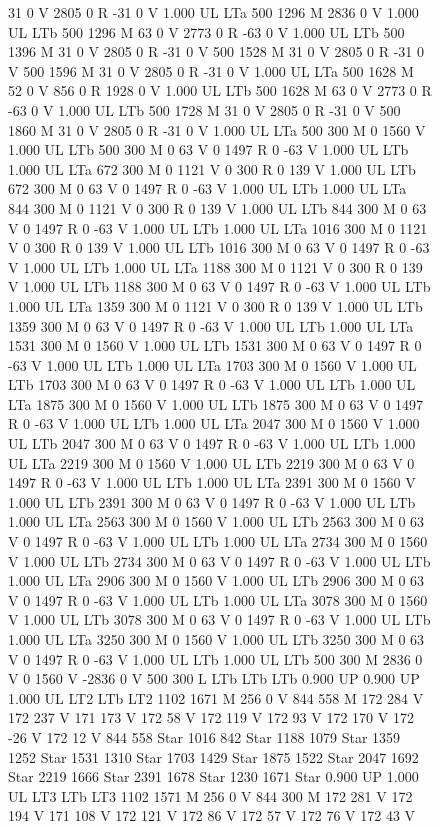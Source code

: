 \documentclass{LMCS}
\begin{document}
\begin{figure}[!tbp]
\begin{minipage}[b]{.47\linewidth}
{{{31 0 V
2805 0 R
-31 0 V
1.000 UL
LTa
500 1296 M
2836 0 V
1.000 UL
LTb
500 1296 M
63 0 V
2773 0 R
-63 0 V
1.000 UL
LTb
500 1396 M
31 0 V
2805 0 R
-31 0 V
500 1528 M
31 0 V
2805 0 R
-31 0 V
500 1596 M
31 0 V
2805 0 R
-31 0 V
1.000 UL
LTa
500 1628 M
52 0 V
856 0 R
1928 0 V
1.000 UL
LTb
500 1628 M
63 0 V
2773 0 R
-63 0 V
1.000 UL
LTb
500 1728 M
31 0 V
2805 0 R
-31 0 V
500 1860 M
31 0 V
2805 0 R
-31 0 V
1.000 UL
LTa
500 300 M
0 1560 V
1.000 UL
LTb
500 300 M
0 63 V
0 1497 R
0 -63 V
1.000 UL
LTb
1.000 UL
LTa
672 300 M
0 1121 V
0 300 R
0 139 V
1.000 UL
LTb
672 300 M
0 63 V
0 1497 R
0 -63 V
1.000 UL
LTb
1.000 UL
LTa
844 300 M
0 1121 V
0 300 R
0 139 V
1.000 UL
LTb
844 300 M
0 63 V
0 1497 R
0 -63 V
1.000 UL
LTb
1.000 UL
LTa
1016 300 M
0 1121 V
0 300 R
0 139 V
1.000 UL
LTb
1016 300 M
0 63 V
0 1497 R
0 -63 V
1.000 UL
LTb
1.000 UL
LTa
1188 300 M
0 1121 V
0 300 R
0 139 V
1.000 UL
LTb
1188 300 M
0 63 V
0 1497 R
0 -63 V
1.000 UL
LTb
1.000 UL
LTa
1359 300 M
0 1121 V
0 300 R
0 139 V
1.000 UL
LTb
1359 300 M
0 63 V
0 1497 R
0 -63 V
1.000 UL
LTb
1.000 UL
LTa
1531 300 M
0 1560 V
1.000 UL
LTb
1531 300 M
0 63 V
0 1497 R
0 -63 V
1.000 UL
LTb
1.000 UL
LTa
1703 300 M
0 1560 V
1.000 UL
LTb
1703 300 M
0 63 V
0 1497 R
0 -63 V
1.000 UL
LTb
1.000 UL
LTa
1875 300 M
0 1560 V
1.000 UL
LTb
1875 300 M
0 63 V
0 1497 R
0 -63 V
1.000 UL
LTb
1.000 UL
LTa
2047 300 M
0 1560 V
1.000 UL
LTb
2047 300 M
0 63 V
0 1497 R
0 -63 V
1.000 UL
LTb
1.000 UL
LTa
2219 300 M
0 1560 V
1.000 UL
LTb
2219 300 M
0 63 V
0 1497 R
0 -63 V
1.000 UL
LTb
1.000 UL
LTa
2391 300 M
0 1560 V
1.000 UL
LTb
2391 300 M
0 63 V
0 1497 R
0 -63 V
1.000 UL
LTb
1.000 UL
LTa
2563 300 M
0 1560 V
1.000 UL
LTb
2563 300 M
0 63 V
0 1497 R
0 -63 V
1.000 UL
LTb
1.000 UL
LTa
2734 300 M
0 1560 V
1.000 UL
LTb
2734 300 M
0 63 V
0 1497 R
0 -63 V
1.000 UL
LTb
1.000 UL
LTa
2906 300 M
0 1560 V
1.000 UL
LTb
2906 300 M
0 63 V
0 1497 R
0 -63 V
1.000 UL
LTb
1.000 UL
LTa
3078 300 M
0 1560 V
1.000 UL
LTb
3078 300 M
0 63 V
0 1497 R
0 -63 V
1.000 UL
LTb
1.000 UL
LTa
3250 300 M
0 1560 V
1.000 UL
LTb
3250 300 M
0 63 V
0 1497 R
0 -63 V
1.000 UL
LTb
1.000 UL
LTb
500 300 M
2836 0 V
0 1560 V
-2836 0 V
500 300 L
LTb
LTb
LTb
0.900 UP
0.900 UP
1.000 UL
LT2
LTb
LT2
1102 1671 M
256 0 V
844 558 M
172 284 V
172 237 V
171 173 V
172 58 V
172 119 V
172 93 V
172 170 V
172 -26 V
172 12 V
844 558 Star
1016 842 Star
1188 1079 Star
1359 1252 Star
1531 1310 Star
1703 1429 Star
1875 1522 Star
2047 1692 Star
2219 1666 Star
2391 1678 Star
1230 1671 Star
0.900 UP
1.000 UL
LT3
LTb
LT3
1102 1571 M
256 0 V
844 300 M
172 281 V
172 194 V
171 108 V
172 121 V
172 86 V
172 57 V
172 76 V
172 43 V
}}}
\end{minipage}
\end{figure}
\end{document}
